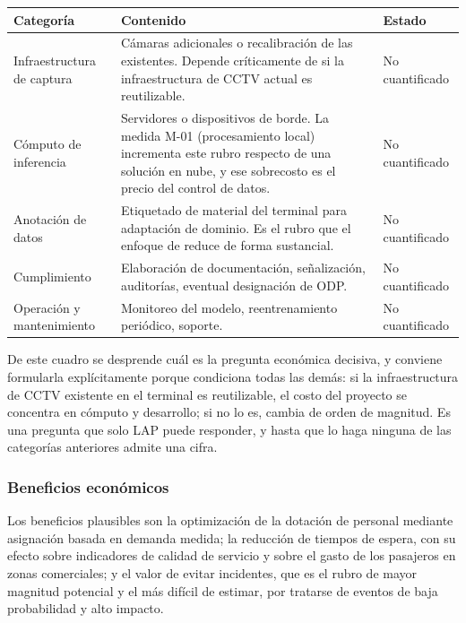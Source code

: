 \begin{center}
\small
\begin{tabularx}{\linewidth}{@{}L{3.3cm}YL{2.4cm}@{}}
\toprule
\textbf{Categoría} & \textbf{Contenido} & \textbf{Estado} \\
\midrule
Infraestructura de captura &
Cámaras adicionales o recalibración de las existentes. Depende
críticamente de si la infraestructura de CCTV actual es reutilizable. &
No cuantificado \\
\addlinespace
Cómputo de inferencia &
Servidores o dispositivos de borde. La medida M-01 (procesamiento local)
incrementa este rubro respecto de una solución en nube, y ese sobrecosto
es el precio del control de datos. &
No cuantificado \\
\addlinespace
Anotación de datos &
Etiquetado de material del terminal para adaptación de dominio. Es el
rubro que el enfoque de \cite{Lin_2025_CVPR} reduce de forma
sustancial. &
No cuantificado \\
\addlinespace
Cumplimiento &
Elaboración de documentación, señalización, auditorías, eventual
designación de ODP. &
No cuantificado \\
\addlinespace
Operación y mantenimiento &
Monitoreo del modelo, reentrenamiento periódico, soporte. &
No cuantificado \\
\bottomrule
\end{tabularx}
\end{center}

De este cuadro se desprende cuál es la pregunta económica decisiva, y
conviene formularla explícitamente porque condiciona todas las demás: si
la infraestructura de CCTV existente en el terminal es reutilizable, el
costo del proyecto se concentra en cómputo y desarrollo; si no lo es,
cambia de orden de magnitud. Es una pregunta que solo LAP puede
responder, y hasta que lo haga ninguna de las categorías anteriores
admite una cifra.

\subsubsection{Beneficios económicos}

Los beneficios plausibles son la optimización de la dotación de personal
mediante asignación basada en demanda medida; la reducción de tiempos de
espera, con su efecto sobre indicadores de calidad de servicio y sobre el
gasto de los pasajeros en zonas comerciales; y el valor de evitar
incidentes, que es el rubro de mayor magnitud potencial y el más difícil
de estimar, por tratarse de eventos de baja probabilidad y alto impacto.


